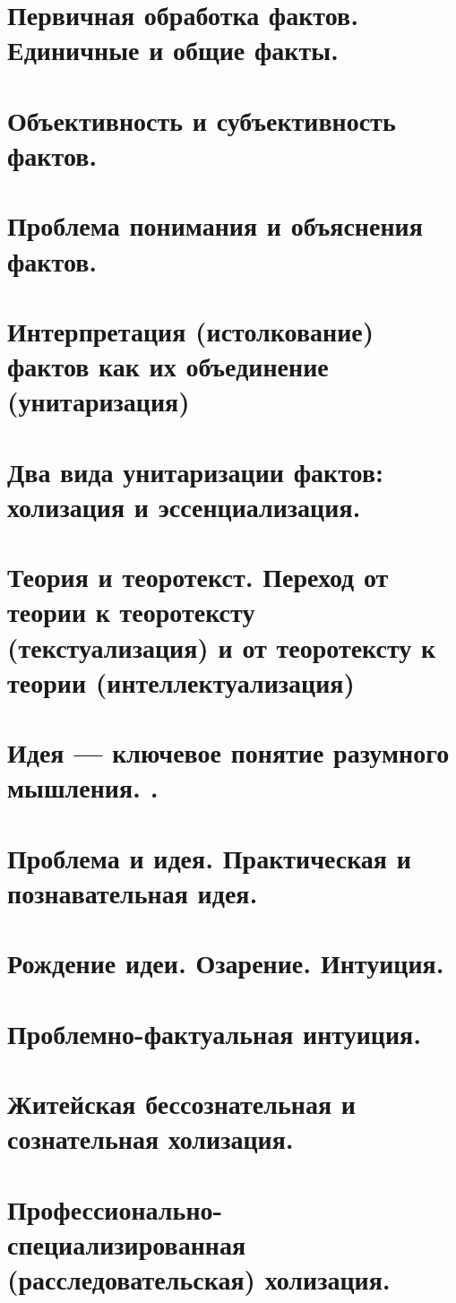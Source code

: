 \section{ Первичная обработка фактов. Единичные и общие факты.}
\section{ Объективность и субъективность фактов.}
\section{ Проблема понимания и объяснения фактов.}
\section{ Интерпретация (истолкование) фактов как их объединение (унитаризация)}
\section{ Два вида унитаризации фактов: холизация и эссенциализация.}
\section{ Теория и теоротекст. Переход от теории к теоротексту (текстуализация) и от теоротексту к теории (интеллектуализация)}
\section{ Идея — ключевое понятие разумного мышления. .}
\section{ Проблема и идея. Практическая и познавательная идея.}
\section{ Рождение идеи. Озарение. Интуиция.}
\section{ Проблемно-фактуальная интуиция.}
\section{ Житейская бессознательная и сознательная холизация. }
\section{ Профессионально-специализированная (расследовательская) холизация.}
